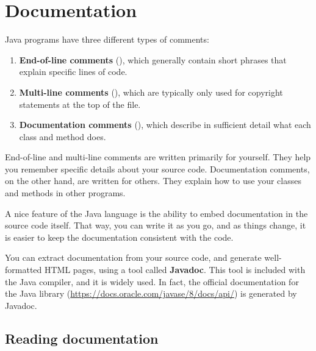 \chapter{Documentation}
\label{app:javadoc}


Java programs have three different types of comments:

\begin{enumerate}
\item {\bf End-of-line comments} (\java{//}), which generally contain short phrases that explain specific lines of code.
\item {\bf Multi-line comments} (\java{/*}), which are typically only used for copyright statements at the top of the file.
\item {\bf Documentation comments} (\java{/**}), which describe in sufficient detail what each class and method does.
\end{enumerate}

End-of-line and multi-line comments are written primarily for yourself.
They help you remember specific details about your source code.
Documentation comments, on the other hand, are written for others.
They explain how to use your classes and methods in other programs.


A nice feature of the Java language is the ability to embed documentation in the source code itself.
That way, you can write it as you go, and as things change, it is easier to keep the documentation consistent with the code.

You can extract documentation from your source code, and generate well-formatted HTML pages, using a tool called {\bf Javadoc}.
This tool is included with the Java compiler, and it is widely used.
In fact, the official documentation for the Java library (\url{https://docs.oracle.com/javase/8/docs/api/}) is generated by Javadoc.


\section{Reading documentation}



